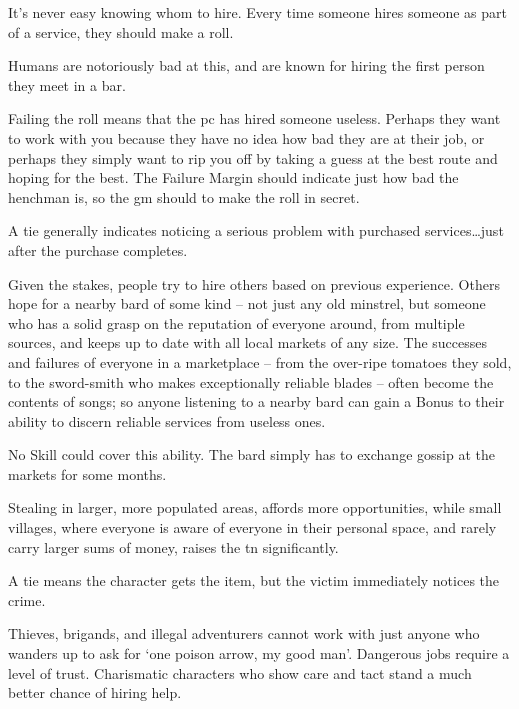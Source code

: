 \begin{multicols}{2}
It's never easy knowing whom to hire.
Every time someone hires someone as part of a service, they should make a roll.

Humans are notoriously bad at this, and are known for hiring the first person they meet in a bar.

Failing the roll means that the \gls{pc} has hired someone useless.
Perhaps they want to work with you because they have no idea how bad they are at their job, or perhaps they simply want to rip you off by taking a guess at the best route and hoping for the best.
The Failure Margin should indicate just how bad the henchman is, so the \gls{gm} should to make the roll in secret.

A tie generally indicates noticing a serious problem with purchased services\ldots just after the purchase completes.

Given the stakes, people try to hire others based on previous experience.
Others hope for a nearby bard of some kind -- not just any old minstrel, but someone who has a solid grasp on the reputation of everyone around, from multiple sources, and keeps up to date with all local markets of any size.
The successes and failures of everyone in a marketplace -- from the over-ripe tomatoes they sold, to the sword-smith who makes exceptionally reliable blades -- often become the contents of songs; so anyone listening to a nearby bard can gain a Bonus to their ability to discern reliable services from useless ones.

No Skill could cover this ability.
The bard simply has to exchange gossip at the markets for some months.

Stealing in larger, more populated areas, affords more opportunities, while small \glspl{village}, where everyone is aware of everyone in their personal space, and rarely carry larger sums of money, raises the \gls{tn} significantly.


A tie means the character gets the item, but the victim immediately notices the crime.

\larcenyChart

Thieves, brigands, and illegal adventurers cannot work with just anyone who wanders up to ask for `one poison arrow, my good man'.
Dangerous jobs require a level of trust.
Charismatic characters who show care and tact stand a much better chance of hiring help.


\end{multicols}
